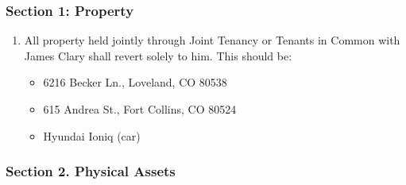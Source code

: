 \subsubsection*{Section 1: Property}\label{section-1-property}

\begin{enumerate}
\def\labelenumi{\arabic{enumi}.}
\tightlist
\item
  All property held jointly through Joint Tenancy or Tenants in Common with James Clary shall revert solely to him. This should be:

  \begin{itemize}
  \tightlist
  \item
    6216 Becker Ln., Loveland, CO 80538
  \item
    615 Andrea St., Fort Collins, CO 80524
  \item
    Hyundai Ioniq (car)
  \end{itemize}
\end{enumerate}

\subsubsection*{Section 2. Physical Assets}\label{section-2.-physical-assets}

